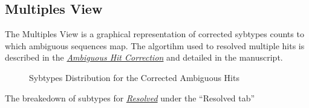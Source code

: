 \documentclass[letterpaper,10pt,english]{sphinxmanual}
\begin{document}
\subsection{Multiples View}
\label{Web:multiples-view}
The Multiples View is a graphical representation of corrected sybtypes
counts to which ambiguous sequences map. The algortihm used to
resolved multiple hits is described in the {\hyperref[defs:multiple-hits]{\emph{Ambiguous Hit Correction}}} and
detailed in the manuscript.
\begin{figure}[htbp]
\centering
\capstart

\caption{Sybtypes Distribution for the Corrected Ambiguous Hits}\end{figure}

The breakedown of subtypes for {\hyperref[defs:resolved]{\emph{Resolved}}} under the ``Resolved tab''
\end{document}
